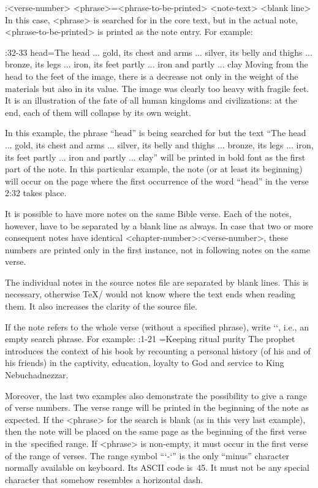 \begtt
{}:<verse-number> {<phrase>}={<phrase-to-be-printed>}
<note-text>
<blank line>
\endtt
In this case, <phrase> is searched for in the core text, but in the actual
note, <phrase-to-be-printed> is printed as the note entry. For example:

\begtt
{}:32-33 {head}={The head ... gold, its chest and arms ... silver, its belly 
   and thighs ... bronze, its legs ... iron, its feet partly ... iron and partly ... clay} 
Moving from the head to the feet of the image, there is a decrease not only in the  weight
of the materials but also in its value. The image was clearly too heavy with fragile feet.
It is an illustration of the fate of all human kingdoms and civilizations:  at the end,
each of them will collapse by its own weight.
\endtt

In this example, the phrase “head” is being searched for but the text “The head ... gold, its chest and arms ... silver, its belly and thighs ... 
bronze, its legs ... iron, its feet partly ... iron and partly ... clay” will be printed in bold font as the first part of the note.
In this particular example, the note (or at least its beginning) will occur on the page where the first occurrence of the word “head” in the verse 2:32 takes place.

It is  possible to have more notes on the same Bible verse. Each of the notes, however, have to be separated by a blank line as always. 
In case that two or more consequent notes have identical <chapter-number>:<verse-number>, these numbers are printed only in the first instance, not in following notes on the same verse.

The individual notes in the source notes file are separated by blank
lines. This is necessary, otherwise \TeX/ would not know where the text ends when reading them. 
It also increases the clarity of the source file. 

If the note refers to the whole verse (without a specified phrase), write
`{}`, i.e., an empty search phrase. For example:
\begtt
{}:1-21 {}={Keeping ritual purity}
The prophet introduces the context of his book by recounting a personal history
(of his and of his friends) in the captivity, education, loyalty to God and service 
to King Nebuchadnezzar.
\endtt

Moreover, the last two examples also demonstrate the possibility to give a range of verse numbers.
The verse range will be printed in the beginning of the note as expected.
If the <phrase> for the search is blank (as in this very last example), then the note
will be placed on the same page as the beginning of the first verse in the~specified range.
If <phrase> is non-empty, it must occur in the first verse of the range of verses. 
The range symbol “`-`” is the only “minus” character normally available on
keyboard. Its ASCII code is~45. It must not be any special character that somehow resembles a horizontal 
dash.


